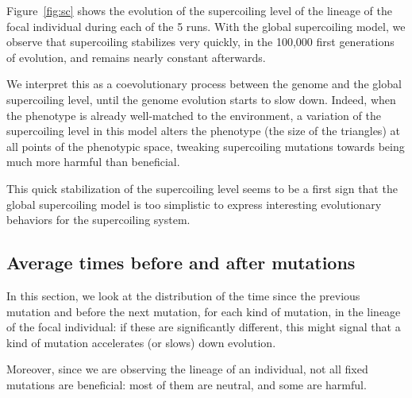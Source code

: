 Figure~\ref{fig:sc} shows the evolution of the supercoiling level of the lineage of the focal individual during each of the 5 runs.
With the global supercoiling model, we observe that supercoiling stabilizes very quickly, in the 100,000 first generations of evolution, and remains nearly constant afterwards.

We interpret this as a coevolutionary process between the genome and the global supercoiling level, until the genome evolution starts to slow down.
Indeed, when the phenotype is already well-matched to the environment, a variation of the supercoiling level in this model alters the phenotype (the size of the triangles) at all points of the phenotypic space, tweaking supercoiling mutations towards being much more harmful than beneficial.

This quick stabilization of the supercoiling level seems to be a first sign that the global supercoiling model is too simplistic to express interesting evolutionary behaviors for the supercoiling system.

\subsection{Average times before and after mutations}

In this section, we look at the distribution of the time since the previous mutation and before the next mutation, for each kind of mutation, in the lineage of the focal individual: if these are significantly different, this might signal that a kind of mutation accelerates (or slows) down evolution.

Moreover, since we are observing the lineage of an individual, not all fixed mutations are beneficial: most of them are neutral, and some are harmful.

